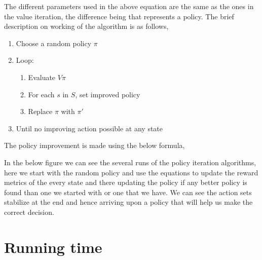 The different parameters used in the above equation are the same as the ones in
the value iteration, the difference being that   represents a policy. The brief
description on working of the algorithm is as follows, 
\begin{enumerate}
    \item Choose a random policy $\pi$
    \item Loop: 
        \begin{enumerate}
            \item Evaluate $V\pi$ 
            \item For each $s$ in $S$, set improved policy
            \item Replace $\pi$ with $\pi\prime$ 
        \end{enumerate}
        \item Until no improving action possible at any state
\end{enumerate}

The policy improvement is made using the below formula,



In the below figure we can see the several runs of the policy iteration
algorithms, here we start with the random policy and use the equations to update
the reward metrics of the every state and there updating the policy if any
better policy is found than one we started with or one that we have. We can see
the action sets stabilize at the end and hence arriving upon a policy that will
help us make the correct decision.
 
 
\section{Running time}

